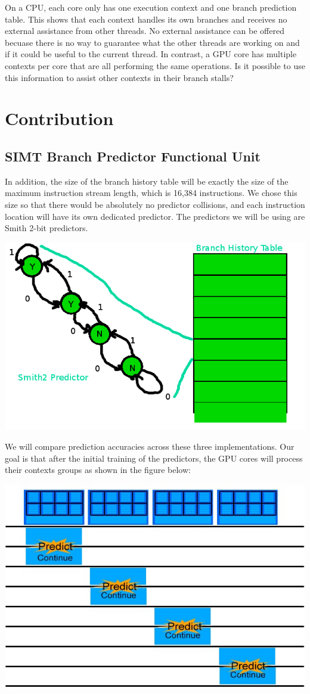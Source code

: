 \documentclass[conference]{IEEEtran}
\begin{document}
On a CPU, each core only has one execution context and one branch prediction table.  This shows that each context handles its own branches and receives no external assistance from other threads.  No external assistance can be offered becuase there is no way to guarantee what the other threads are working on and if it could be useful to the current thread.  In contrast, a GPU core has multiple contexts per core that are all performing the same operations.  Is it possible to use this information to assist other contexts in their branch stalls?

\section{Contribution}

\subsection{SIMT Branch Predictor Functional Unit}
In addition, the size of the branch history table will be exactly the size of the maximum instruction stream length, which is 16,384 instructions.  We chose this size so that there would be absolutely no predictor collisions, and each instruction location will have its own dedicated predictor.  The predictors we will be using are Smith 2-bit predictors.

\begin{center}
	\includegraphics[width=.45\textwidth]{bht.png}
\end{center}

We will compare prediction accuracies across these three implementations.  Our goal is that after the initial training of the predictors, the GPU cores will process their contexts groups as shown in the figure below:

\begin{center}
	\includegraphics[width=.45\textwidth]{GPU-predict-context.jpg}
\end{center}
\end{document}
